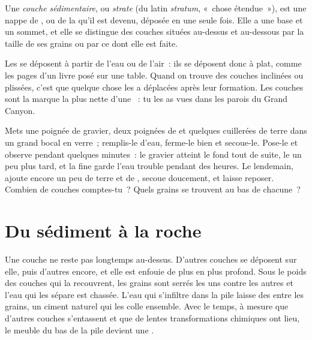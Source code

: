 \begin{definition}\label{def:g7:sediments-and-fossils:layer}
Une \emph{couche sédimentaire},
ou \emph{strate} (du latin \emph{stratum}, «~chose étendue~»), est une nappe de , ou de la 
qu'il est devenu, déposée en une seule fois. Elle a une base et un sommet,
et elle se distingue des couches situées au-dessus et au-dessous par la
taille de ses grains ou par ce dont elle est faite.
\end{definition}

Les  se déposent à partir de l'eau ou de l'air~: ils se déposent
donc à plat, comme les pages d'un livre posé sur une table. Quand on trouve
des couches inclinées ou plissées, c'est que quelque chose les a déplacées
après leur formation. Les couches sont la marque la plus nette d'une ~: tu les as vues dans les parois du Grand Canyon.

\begin{inthelab}
Mets une poignée de gravier, deux poignées de  et quelques cuillerées
de terre dans un grand bocal en verre~; remplis-le d'eau, ferme-le bien et
secoue-le. Pose-le et observe pendant quelques minutes~: le gravier atteint
le fond tout de suite, le  un peu plus tard, et la  fine garde
l'eau trouble pendant des heures. Le lendemain, ajoute encore un peu de
terre et de , secoue doucement, et laisse reposer. Combien de couches
comptes-tu~? Quels grains se trouvent au bas de chacune~?
\end{inthelab}

\section{Du sédiment à la roche}

Une couche ne reste pas longtemps au-dessus. D'autres couches se déposent
sur elle, puis d'autres encore, et elle est enfouie de plus en plus
profond. Sous le poids des couches qui la recouvrent, les grains sont
serrés les uns contre les autres et l'eau qui les sépare est chassée. L'eau
qui s'infiltre dans la pile laisse des  entre les grains, un
ciment naturel qui les colle ensemble. Avec le temps, à mesure que d'autres
couches s'entassent et que de lentes transformations chimiques ont lieu, le
 meuble du bas de la pile devient une .


